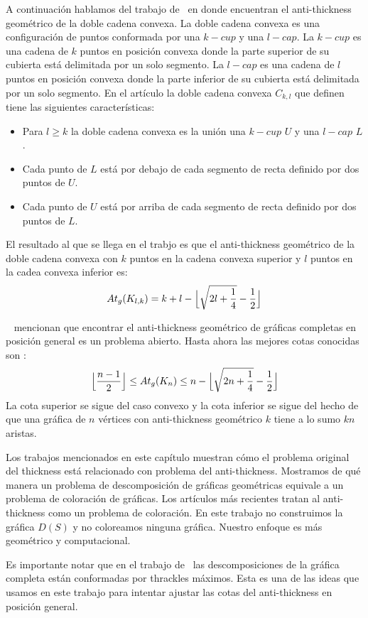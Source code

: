 A continuación hablamos del trabajo de~\cite{Lomeli2018} en donde encuentran el
anti-thickness geométrico de la doble cadena convexa. La doble cadena convexa
es una configuración de puntos conformada por una $k-cup$ y una $l-cap$. La $k-cup$
es una cadena de $k$ puntos en posición convexa donde la parte superior de su
cubierta está delimitada por un solo segmento. La $l-cap$ es una cadena
de $l$ puntos en posición convexa donde la parte inferior de su cubierta está delimitada
por un solo segmento. En el artículo la doble cadena convexa $C_{k,l}$ que definen tiene
las siguientes características:
\begin{itemize}
  \item Para $l\geq k$ la doble cadena convexa es la unión una $k-cup$ $U$ y una $l-cap$ $L$.
  \item Cada punto de $L$ está por debajo de cada segmento de recta definido por dos puntos de $U$.
  \item Cada punto de $U$ está por arriba de cada segmento de recta definido por dos puntos de $L$.
\end{itemize}

El resultado al que se llega en el trabjo es que
el anti-thickness geométrico de la doble cadena convexa con $k$ puntos en la cadena convexa superior
y $l$ puntos en la cadea convexa inferior es:
 \[At_g(K_{l,k}) = k+l-\Bigl\lfloor \sqrt{2l+\frac{1}{4}} - \frac{1}{2} \Bigr\rfloor\]

 ~\cite{Dujmovic2017} mencionan que encontrar el anti-thickness geométrico de gráficas
 completas en posición general es un problema abierto. Hasta ahora las mejores cotas conocidas
 son :
 \[\Bigl\lfloor\frac{n-1}{2}\Bigr\rfloor \leq At_g(K_n) \leq n - \Bigl\lfloor \sqrt{2n + \frac{1}{4}} - \frac{1}{2} \Bigr\rfloor \]
 La cota superior se sigue del caso convexo y la cota inferior
 se sigue del hecho de que una gráfica de $n$ vértices
con anti-thickness geométrico $k$ tiene a lo sumo $kn$ aristas.

Los trabajos mencionados en este capítulo muestran cómo el problema original del
thickness está relacionado con problema del anti-thickness. Mostramos de qué manera
un problema de descomposición de gráficas geométricas equivale
a un problema de coloración de gráficas. Los artículos más recientes tratan al
anti-thickness como un problema de coloración. En este trabajo no construimos la
gráfica $D(S)$ y no coloreamos ninguna gráfica. Nuestro enfoque es más geométrico
y computacional.


Es importante notar que en el trabajo de~\cite{Fabila-Monroy2018} las descomposiciones
de la gráfica completa están conformadas por thrackles máximos. Esta es una de las ideas que
usamos en este trabajo para intentar ajustar las cotas del anti-thickness en posición
general.
